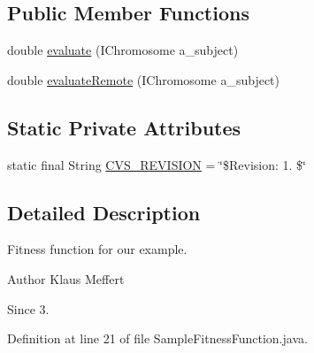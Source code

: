 \subsection*{Public Member Functions}
\begin{DoxyCompactItemize}
\item 
double \hyperlink{classexamples_1_1grid_1_1fitness_distributed_1_1_sample_fitness_function_aeaf8526640fd30985cb4e025c2e41cb6}{evaluate} (I\-Chromosome a\-\_\-subject)
\item 
double \hyperlink{classexamples_1_1grid_1_1fitness_distributed_1_1_sample_fitness_function_a60635b700e32fd8aac26122d2f2b8662}{evaluate\-Remote} (I\-Chromosome a\-\_\-subject)
\end{DoxyCompactItemize}
\subsection*{Static Private Attributes}
\begin{DoxyCompactItemize}
\item 
static final String \hyperlink{classexamples_1_1grid_1_1fitness_distributed_1_1_sample_fitness_function_a135ae4745e369d0f4aff97e507e2188a}{C\-V\-S\-\_\-\-R\-E\-V\-I\-S\-I\-O\-N} = \char`\"{}\$Revision\-: 1. \$\char`\"{}
\end{DoxyCompactItemize}


\subsection{Detailed Description}
Fitness function for our example.

\begin{DoxyAuthor}{Author}
Klaus Meffert 
\end{DoxyAuthor}
\begin{DoxySince}{Since}
3. 
\end{DoxySince}


Definition at line 21 of file Sample\-Fitness\-Function.\-java.



